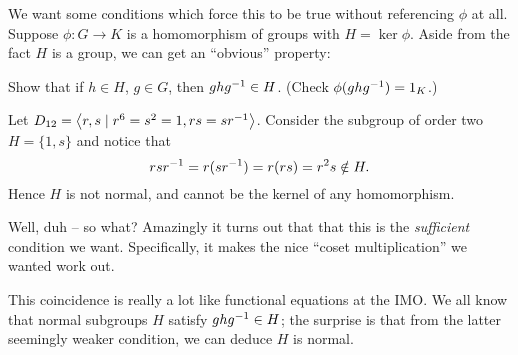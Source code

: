 We want some conditions which force this to be true without referencing $\phi$ at all.
Suppose $\phi \colon G \to K$ is a homomorphism of groups with $H = \ker\phi$.
Aside from the fact $H$ is a group, we can get an ``obvious'' property:
\begin{ques}
	Show that if $h \in H$, $g \in G$,
	then $ghg^{-1} \in H$.
	(Check $\phi(ghg^{-1}) = 1_K$.)
\end{ques}
\begin{example}
	\label{ex:dihedral_normal_subgroup}
	Let $D_{12} = \left<r,s \mid r^6=s^2=1, rs=sr^{-1}\right>$.
	Consider the subgroup of order two $H = \{1,s\}$
	and notice that \[ rsr^{-1} = r(sr^{-1})= r(rs) = r^2s \notin H. \]
	Hence $H$ is not normal, and cannot be the kernel of any homomorphism.
\end{example}
Well, duh -- so what?
Amazingly it turns out that that this is the \emph{sufficient} condition we want.
Specifically, it makes the nice ``coset multiplication'' we wanted work out.
\begin{remark}
	This coincidence is really a lot like functional equations at the IMO.
	We all know that normal subgroups $H$ satisfy $ghg^{-1} \in H$;
	the surprise is that from the latter seemingly weaker condition,
	we can deduce $H$ is normal.
\end{remark}

